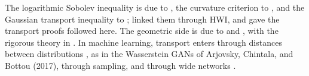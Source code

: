 \begin{refsection}
The logarithmic Sobolev inequality is due to \textcite{Gross1975}, the curvature criterion to \textcite{BakryEmery1985}, and the Gaussian transport inequality to \textcite{Talagrand1996}; \textcite{OttoVillani2000} linked them through HWI, and \textcite{CorderoErausquin2002} gave the transport proofs followed here. The geometric side is due to \textcite{JordanKinderlehrerOtto1998} and \textcite{Otto2001}, with the rigorous theory in \textcite{AmbrosioGigliSavare2008}. In machine learning, transport enters through distances between distributions \parencite{Cuturi2013}, as in the Wasserstein GANs of Arjovsky, Chintala, and Bottou (2017), through sampling, and through wide networks \parencite{ChizatBach2018,MeiMontanariNguyen2018}.

\printchapterbib
\end{refsection}
